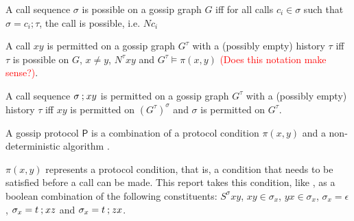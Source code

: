 \begin{definition}[Calls]
    \begin{subdefinition}
        \label{def:call-sequence-possibility}
        A call sequence \(\sigma\) is possible on a gossip graph \(G\) iff for all calls \(c_i \in \sigma\) such that \(\sigma = c_i\mathbin{;}\tau\), the call is possible, i.e. \(Nc_i\)
    \end{subdefinition}

    \begin{subdefinition}
        \label{def:call-permissibility}
        A call \(xy\) is permitted on a gossip graph \(G^\tau\) with a (possibly empty) history \(\tau\) iff \(\tau\) is possible on \(G\), \(x \neq y\), \(N^\tau xy\) and \(G^\tau \models \pi(x,y)\) \textcolor{red}{(Does this notation make sense?)}.
    \end{subdefinition}

    \begin{subdefinition}
        \label{def:call-sequence-permissibility}
        A call sequence \(\sigma \mathbin{;} xy\) is permitted on a gossip graph \(G^\tau\) with a (possibly empty) history \(\tau\) iff \(xy\) is permitted on \((G^\tau)^\sigma\) and \(\sigma\) is permitted on \(G^\tau\).
    \end{subdefinition}
\end{definition}

\begin{definition}
    \label{def:gossip-protocol}
    A gossip protocol \(\mathsf{P}\) is a combination of a protocol condition \(\pi(x,y)\) and a non-deterministic algorithm \parencite[for examples see][p. 708]{van_ditmarsch_dynamic_2018}.

    \begin{subdefinition}
        \label{def:protocol-condition}
        \(\pi(x,y)\) represents a protocol condition, that is, a condition that needs to be satisfied before a call can be made.
        This report takes this condition, like \textcite{van_ditmarsch_dynamic_2018}, as a boolean combination of the following constituents: \(S^\sigma xy\), \(xy \in \sigma_x\), \(yx \in \sigma_x\), \(\sigma_x = \epsilon\), \(\sigma_x = t \mathbin{;} xz\) and \(\sigma_x = t \mathbin{;} zx\).
    \end{subdefinition}
\end{definition}


